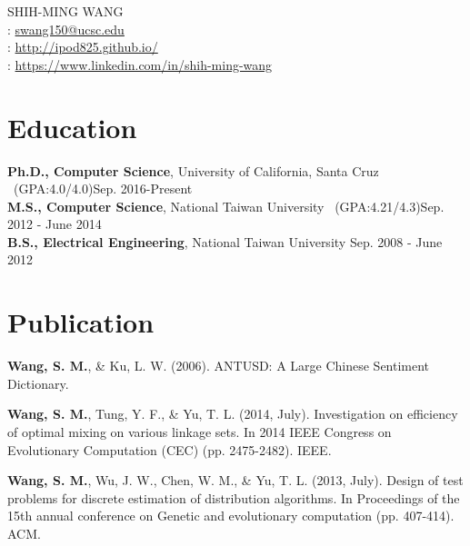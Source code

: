 \documentclass[a4paper,10pt]{article}
\begin{document}
\pagestyle{empty} %

\par{
    \center
{\Huge SHIH-MING WANG}\\
\faEnvelope: \href{mailto:swang150@ucsc.edu}{swang150@ucsc.edu} \\
\faUser: \href{http://ipod825.github.io/}{http://ipod825.github.io/}\\
\faLinkedin: \href{https://www.linkedin.com/in/shih-ming-wang-73aa3769/}{https://www.linkedin.com/in/shih-ming-wang}\\
\bigskip\par}

\section{Education}
    \textbf{Ph.D., Computer Science}, University of California, Santa Cruz \ (GPA:4.0/4.0)\hfill Sep. 2016-Present\\
    \textbf{M.S., Computer Science}, National Taiwan University \ (GPA:4.21/4.3)\hfill Sep. 2012 - June 2014 \\
    \textbf{B.S., Electrical Engineering}, National Taiwan University \hfill Sep. 2008 - June 2012

\section{Publication}
\textbf{Wang, S. M.}, \& Ku, L. W. (2006). ANTUSD: A Large Chinese Sentiment Dictionary.

\textbf{Wang, S. M.}, Tung, Y. F., \& Yu, T. L. (2014, July). Investigation on efficiency of optimal mixing on various linkage sets. In 2014 IEEE Congress on Evolutionary Computation (CEC) (pp. 2475-2482). IEEE.

\textbf{Wang, S. M.}, Wu, J. W., Chen, W. M., \& Yu, T. L. (2013, July). Design of test problems for discrete estimation of distribution algorithms. In Proceedings of the 15th annual conference on Genetic and evolutionary computation (pp. 407-414). ACM.
\end{document}

